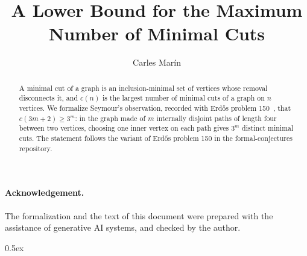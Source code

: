 \documentclass[10pt,a4paper]{article}
\begin{document}
\title{A Lower Bound for the Maximum Number of Minimal Cuts}
\author{Carles Mar\'in}
\maketitle

\begin{abstract}
A minimal cut of a graph is an inclusion-minimal set of vertices whose removal disconnects it, and $c(n)$ is the largest number of minimal cuts of a graph on $n$ vertices. We formalize Seymour's observation, recorded with Erd\H{o}s problem 150~\cite{EP150,Erdos1988}, that $c(3m+2)\ge 3^m$: in the graph made of $m$ internally disjoint paths of length four between two vertices, choosing one inner vertex on each path gives $3^m$ distinct minimal cuts. The statement follows the variant of Erd\H{o}s problem 150 in the formal-conjectures repository.
\end{abstract}

\paragraph{Acknowledgement.} The formalization and the text of this document were prepared with the
assistance of generative AI systems, and checked by the author.

\tableofcontents

\parindent 0pt\parskip 0.5ex





\end{document}
